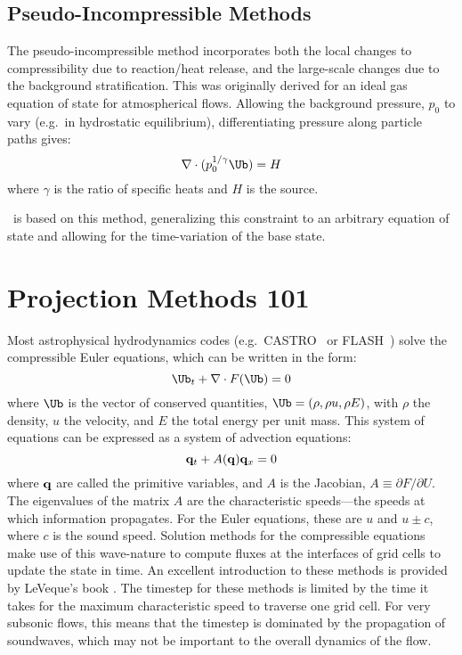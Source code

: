 \subsection{Pseudo-Incompressible Methods}

The pseudo-incompressible method incorporates both the local changes
to compressibility due to reaction/heat release, and the large-scale
changes due to the background stratification.  This was originally
derived for an ideal gas equation of state for atmospherical flows.
Allowing the background pressure, $p_0$ to vary (e.g.\ in hydrostatic
equilibrium), differentiating pressure along particle paths gives:
\begin{equation}
\nabla \cdot (p_0^{1/\gamma} \Ub) = H
\end{equation}
where $\gamma$ is the ratio of specific heats and $H$ is the source.

\maestro\ is based on this method, generalizing this constraint to an
arbitrary equation of state and allowing for the time-variation of the
base state.

\section{Projection Methods 101}

Most astrophysical hydrodynamics codes
(e.g.\ CASTRO~\cite{castro} or FLASH~\cite{flash}) solve the
compressible Euler equations, which can be written in the form:
\begin{equation}
\Ub_t + \nabla \cdot F(\Ub) = 0
\end{equation}
where $\Ub$ is the vector of conserved quantities, $\Ub = (\rho, \rho u,
\rho E)$, with $\rho$ the density, $u$ the velocity, and $E$ the total
energy per unit mass.  This system of equations can be expressed 
as a system of advection equations:
\begin{equation}
{\bf q}_t + A({\bf q}) {\bf q}_x = 0
\end{equation}
where ${\bf q}$ are called the primitive variables, and $A$ is the
Jacobian, $A \equiv \partial F / \partial U$.  The eigenvalues of the
matrix $A$ are the characteristic speeds---the speeds at which
information propagates.  For the Euler equations, these are $u$ and $u
\pm c$, where $c$ is the sound speed.  Solution methods for the
compressible equations make use of this wave-nature to compute fluxes
at the interfaces of grid cells to update the state in time.  An
excellent introduction to these methods is provided by LeVeque's book
\cite{leveque}.  The timestep for these methods is limited by the time
it takes for the maximum characteristic speed to traverse one grid cell.
For very subsonic flows, this means that the timestep is dominated by
the propagation of soundwaves, which may not be important to the
overall dynamics of the flow.


